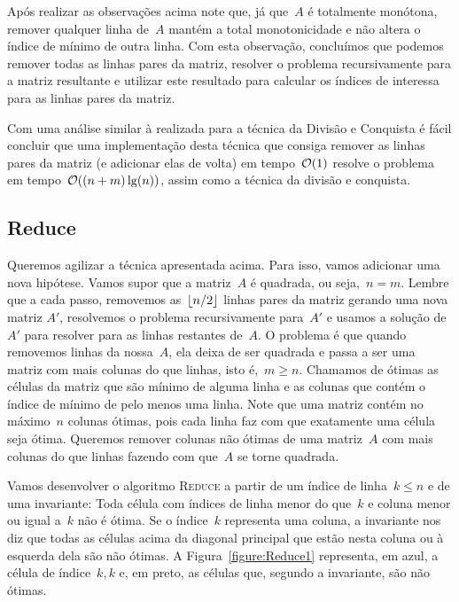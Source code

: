 Após realizar as observações acima note que, já que~$A$ é totalmente monótona, remover qualquer linha de~$A$ mantém a total monotonicidade e não altera o índice de mínimo de outra linha. Com esta observação, concluímos que podemos remover todas as linhas pares da matriz, resolver o problema recursivamente para a matriz resultante e utilizar este resultado para calcular os índices de interessa para as linhas pares da matriz.  

Com uma análise similar à realizada para a técnica da Divisão e Conquista é fácil concluir que uma implementação desta técnica que consiga remover as linhas pares da matriz (e adicionar elas de volta) em tempo~$\mathcal{O}(1)$ resolve o problema em tempo~$\mathcal{O}((n+m)\lg(n))$, assim como a técnica da divisão e conquista.  

\subsection{Reduce}
Queremos agilizar a técnica apresentada acima. Para isso, vamos adicionar uma nova hipótese. Vamos supor que a matriz~$A$ é quadrada, ou seja,~$n = m$. Lembre que a cada passo, removemos as~$\lfloor n/2\rfloor$ linhas pares da matriz gerando uma nova matriz $A'$, resolvemos o problema recursivamente para~$A'$ e usamos a solução de~$A'$ para resolver para as linhas restantes de~$A$. O problema é que quando removemos linhas da nossa~$A$, ela deixa de ser quadrada e passa a ser uma matriz com mais colunas do que linhas, isto é,~$m \geq n$. Chamamos de ótimas as células da matriz que são mínimo de alguma linha e as colunas que contém o índice de mínimo de pelo menos uma linha. Note que uma matriz contém no máximo~$n$ colunas ótimas, pois cada linha faz com que exatamente uma célula seja ótima. Queremos remover colunas não ótimas de uma matriz~$A$ com mais colunas do que linhas fazendo com que~$A$ se torne quadrada.  

Vamos desenvolver o algoritmo \textsc{Reduce} a partir de um índice de linha~$k \leq n$ e de uma invariante: Toda célula com índices de linha menor do que~$k$ e coluna menor ou igual a~$k$ não é ótima. Se o índice~$k$ representa uma coluna, a invariante nos diz que todas as células acima da diagonal principal que estão nesta coluna ou à esquerda dela são não ótimas. A Figura~\ref{figure:Reduce1} representa, em azul, a célula de índice~$k,k$ e, em preto, as células que, segundo a invariante, são não ótimas.

